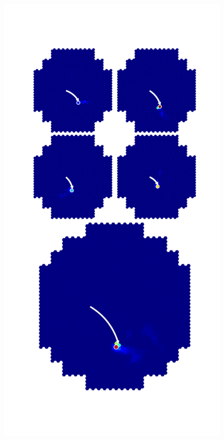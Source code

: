 \documentclass{article}
\begin{document}
\begin{figure}
\centering
\begin{minipage}{0.45\textwidth}
\centering
\includegraphics[trim=80 120 80 150,clip,width=\textwidth]{graphDC}

\end{minipage}
\end{figure}
\end{document}
